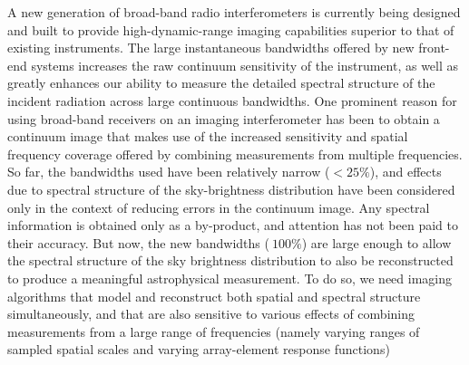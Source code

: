 \documentclass[structabstract]{stylefiles/aa}
\begin{document}
A new generation of broad-band radio interferometers is currently being
designed and built to provide 
high-dynamic-range imaging capabilities superior to that of existing instruments. 
The large instantaneous bandwidths offered by new front-end systems 
increases the raw continuum sensitivity of the instrument,
as well as 
greatly enhances our ability to measure the detailed spectral structure 
of the incident radiation across large continuous bandwidths. 
%
One prominent reason for using broad-band receivers on an imaging
interferometer has been to obtain a continuum image that makes 
use of the increased sensitivity and spatial frequency 
coverage offered by combining measurements from multiple frequencies. 
So far, the bandwidths used have been relatively
narrow ($<25\%$), and effects due to spectral structure of the 
sky-brightness distribution have been considered 
only in the context of reducing errors in the continuum image.%
Any spectral information is obtained only as a by-product, and attention has not 
been paid to their accuracy.
But now, the new bandwidths ($~100\%$) are large enough to allow the spectral 
structure of the sky brightness distribution 
to also be reconstructed to produce a meaningful astrophysical measurement.   
To do so, 
we need imaging 
algorithms that model and reconstruct both spatial and spectral structure simultaneously,
and that are also 
sensitive to various effects of combining measurements from a large range
 of frequencies
 (namely varying ranges of sampled spatial scales and 
varying array-element response functions)

\end{document}
